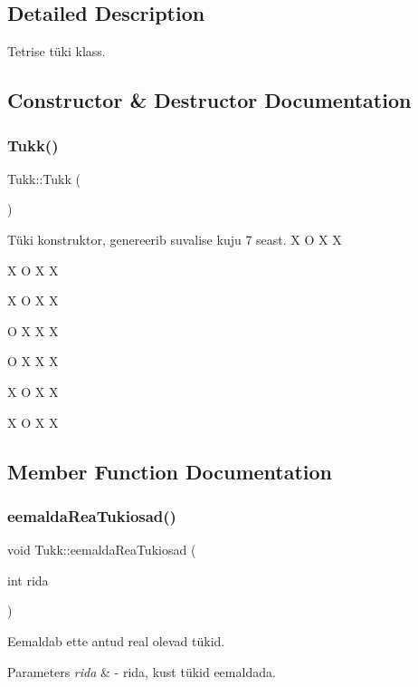 \subsection{Detailed Description}
Tetrise tüki klass. 

\subsection{Constructor \& Destructor Documentation}
\mbox{\label{class_tukk_ae488ab9342984c0cd8423bad2a2b6aaf}} 
\subsubsection{\texorpdfstring{Tukk()}{Tukk()}}
{\footnotesize\ttfamily Tukk\+::\+Tukk (\begin{DoxyParamCaption}{ }\end{DoxyParamCaption})}

Tüki konstruktor, genereerib suvalise kuju 7 seast. X O X X

X O X X

X O X X

O X X X

O X X X

X O X X

X O X X

\subsection{Member Function Documentation}
\mbox{\label{class_tukk_a942fbfd4046c0d89c86854915ecc1126}} 
\subsubsection{\texorpdfstring{eemaldaReaTukiosad()}{eemaldaReaTukiosad()}}
{\footnotesize\ttfamily void Tukk\+::eemalda\+Rea\+Tukiosad (\begin{DoxyParamCaption}\item[{int}]{rida }\end{DoxyParamCaption})}

Eemaldab ette antud real olevad tükid. 
\begin{DoxyParams}{Parameters}
{\em rida} & -\/ rida, kust tükid eemaldada. \\
\hline
\end{DoxyParams}
\mbox{\label{class_tukk_a0314e4600166d267c57877a3e504788f}} 
